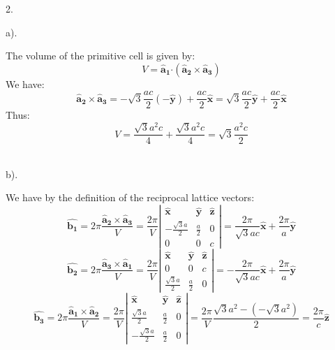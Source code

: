 \documentclass[a4paper,12pt]{article}
\newcommand{\af}{\pmb{\hat a_1}}
\newcommand{\as}{\pmb{\hat a_2}}
\newcommand{\at}{\pmb{\hat a_3}}
\newcommand\uv[1]{\pmb{\hat {#1}}}
\newcommand\dprod{\pmb{\cdot}}
\begin{document}
2.
\begin{minipage}[t]{0.9\textwidth}
  a).
  \begin{minipage}[t]{\textwidth}
    The volume of the primitive cell is given by:
    \begin{equation*}
      V = \af \dprod (\as \times \at)
    \end{equation*}
    We have:
    \begin{equation*}
      \as \times \at = - \sqrt{3}\frac{ac}{2} (- \uv{y}) + \frac{ac}{2} \uv{x} = \sqrt{3}\frac{ac}{2} \uv{y} + \frac{ac}{2} \uv{x}
    \end{equation*}
    Thus:
    \begin{equation*}
      V = \frac{\sqrt{3} a^2c}{4} + \frac{\sqrt{3} a^2c}{4} = \sqrt{3} \frac{a^2c}{2}
    \end{equation*}\\
  \end{minipage}
  b).
  \begin{minipage}[t]{\textwidth}
    We have by the definition of the reciprocal lattice vectors:
    \begin{equation*}
      \uv{b_1} = 2 \pi \frac{\as \times \at}{V} = \frac{2 \pi}{V}
      \left|
      \begin{matrix}
        \uv{x} & \uv{y} & \uv{z}\\
        -\frac{\sqrt{3}a}{2} & \frac{a}{2} & 0\\
        0 & 0 & c
      \end{matrix}
      \right|
      = \frac{2 \pi}{\sqrt{3}ac} \uv{x} + \frac{2\pi}{a}\uv{y}
    \end{equation*}
    \begin{equation*}
      \uv{b_2} = 2 \pi \frac{\at \times \af}{V} = \frac{2 \pi}{V}
      \left|
      \begin{matrix}
        \uv{x} & \uv{y} & \uv{z}\\
        0 & 0 & c\\
        \frac{\sqrt{3}a}{2} & \frac{a}{2} & 0
      \end{matrix}
      \right|
      =  - \frac{2 \pi}{\sqrt{3}ac} \uv{x} + \frac{2\pi}{a}\uv{y}
    \end{equation*}
    \begin{equation*}
      \uv{b_3} = 2 \pi \frac{\af \times \as}{V} = \frac{2 \pi}{V}
      \left|
      \begin{matrix}
        \uv{x} & \uv{y} & \uv{z}\\
         \frac{\sqrt{3}a}{2} & \frac{a}{2} & 0\\
        -\frac{\sqrt{3}a}{2} & \frac{a}{2} & 0
      \end{matrix}
      \right|
      = \frac{2 \pi}{V}\frac{\sqrt{3}a^2 - (-\sqrt{3}a^2)}{2}
      = \frac{2 \pi}{c} \uv{z}
    \end{equation*}
  \end{minipage}


\end{minipage}
\end{document}
